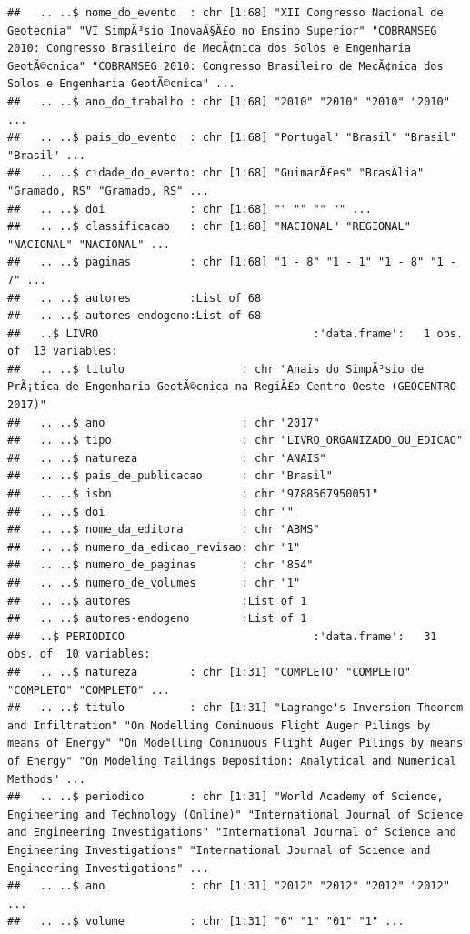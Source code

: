 \documentclass[]{article}
\begin{document}
\begin{verbatim}
##   .. ..$ nome_do_evento  : chr [1:68] "XII Congresso Nacional de Geotecnia" "VI SimpÃ³sio InovaÃ§Ã£o no Ensino Superior" "COBRAMSEG 2010: Congresso Brasileiro de MecÃ¢nica dos Solos e Engenharia GeotÃ©cnica" "COBRAMSEG 2010: Congresso Brasileiro de MecÃ¢nica dos Solos e Engenharia GeotÃ©cnica" ...
##   .. ..$ ano_do_trabalho : chr [1:68] "2010" "2010" "2010" "2010" ...
##   .. ..$ pais_do_evento  : chr [1:68] "Portugal" "Brasil" "Brasil" "Brasil" ...
##   .. ..$ cidade_do_evento: chr [1:68] "GuimarÃ£es" "BrasÃ­lia" "Gramado, RS" "Gramado, RS" ...
##   .. ..$ doi             : chr [1:68] "" "" "" "" ...
##   .. ..$ classificacao   : chr [1:68] "NACIONAL" "REGIONAL" "NACIONAL" "NACIONAL" ...
##   .. ..$ paginas         : chr [1:68] "1 - 8" "1 - 1" "1 - 8" "1 - 7" ...
##   .. ..$ autores         :List of 68
##   .. ..$ autores-endogeno:List of 68
##   ..$ LIVRO                                 :'data.frame':   1 obs. of  13 variables:
##   .. ..$ titulo                  : chr "Anais do SimpÃ³sio de PrÃ¡tica de Engenharia GeotÃ©cnica na RegiÃ£o Centro Oeste (GEOCENTRO 2017)"
##   .. ..$ ano                     : chr "2017"
##   .. ..$ tipo                    : chr "LIVRO_ORGANIZADO_OU_EDICAO"
##   .. ..$ natureza                : chr "ANAIS"
##   .. ..$ pais_de_publicacao      : chr "Brasil"
##   .. ..$ isbn                    : chr "9788567950051"
##   .. ..$ doi                     : chr ""
##   .. ..$ nome_da_editora         : chr "ABMS"
##   .. ..$ numero_da_edicao_revisao: chr "1"
##   .. ..$ numero_de_paginas       : chr "854"
##   .. ..$ numero_de_volumes       : chr "1"
##   .. ..$ autores                 :List of 1
##   .. ..$ autores-endogeno        :List of 1
##   ..$ PERIODICO                             :'data.frame':   31 obs. of  10 variables:
##   .. ..$ natureza        : chr [1:31] "COMPLETO" "COMPLETO" "COMPLETO" "COMPLETO" ...
##   .. ..$ titulo          : chr [1:31] "Lagrange's Inversion Theorem and Infiltration" "On Modelling Coninuous Flight Auger Pilings by means of Energy" "On Modelling Coninuous Flight Auger Pilings by means of Energy" "On Modeling Tailings Deposition: Analytical and Numerical Methods" ...
##   .. ..$ periodico       : chr [1:31] "World Academy of Science, Engineering and Technology (Online)" "International Journal of Science and Engineering Investigations" "International Journal of Science and Engineering Investigations" "International Journal of Science and Engineering Investigations" ...
##   .. ..$ ano             : chr [1:31] "2012" "2012" "2012" "2012" ...
##   .. ..$ volume          : chr [1:31] "6" "1" "01" "1" ...

\end{verbatim}
\end{document}
